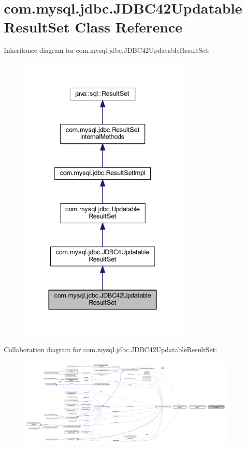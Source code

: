 \hypertarget{classcom_1_1mysql_1_1jdbc_1_1_j_d_b_c42_updatable_result_set}{}\section{com.\+mysql.\+jdbc.\+J\+D\+B\+C42\+Updatable\+Result\+Set Class Reference}
\label{classcom_1_1mysql_1_1jdbc_1_1_j_d_b_c42_updatable_result_set}


Inheritance diagram for com.\+mysql.\+jdbc.\+J\+D\+B\+C42\+Updatable\+Result\+Set\+:
\nopagebreak
\begin{figure}[H]
\begin{center}
\leavevmode
\includegraphics[width=247pt]{classcom_1_1mysql_1_1jdbc_1_1_j_d_b_c42_updatable_result_set__inherit__graph}
\end{center}
\end{figure}


Collaboration diagram for com.\+mysql.\+jdbc.\+J\+D\+B\+C42\+Updatable\+Result\+Set\+:
\nopagebreak
\begin{figure}[H]
\begin{center}
\leavevmode
\includegraphics[width=350pt]{classcom_1_1mysql_1_1jdbc_1_1_j_d_b_c42_updatable_result_set__coll__graph}
\end{center}
\end{figure}
